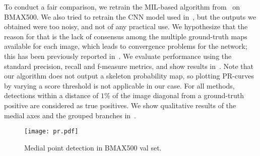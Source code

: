 \documentclass[10pt,twocolumn,letterpaper]{article}
\begin{document}
To conduct a fair comparison, we retrain the MIL-based algorithm from~\cite{tsogkas2012learning} on BMAX500.
We also tried to retrain the CNN model used in~\cite{shen2016object}, but the outputs we obtained were too noisy, 
and not of any practical use.
We hypothesize that the reason for that is the lack of consensus among the multiple ground-truth maps
available for each image, which leads to convergence problems for the network; this has been previously
reported in~\cite{xie2015holistically}.
We evaluate performance using the standard precision, recall and f-measure metrics, 
and show results in~.
Note that our algorithm does not output a skeleton probability map, so plotting
PR-curves by varying a score threshold is not applicable in our case.
For all methods, detections within a distance of $1\%$ of the image diagonal from a ground-truth positive 
are considered as true positives.
We show qualitative results of the medial axes and the grouped branches in~.

\begin{figure}
\centering
\texttt{[image: pr.pdf]}
\caption{Medial point detection in BMAX500 val set.}
\label{fig:experiments:detection:pr}
\end{figure}
\end{document}
